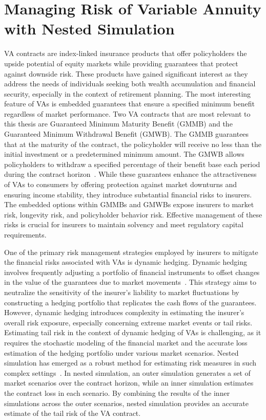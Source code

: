 \section{Managing Risk of Variable Annuity with Nested Simulation}

VA contracts are index-linked insurance products that offer policyholders the upside potential of equity markets while providing guarantees that protect against downside risk.
These products have gained significant interest as they address the needs of individuals seeking both wealth accumulation and financial security, especially in the context of retirement planning.
The most interesting feature of VAs is embedded guarantees that ensure a specified minimum benefit regardless of market performance.
Two VA contracts that are most relevant to this thesis are Guaranteed Minimum Maturity Benefit (GMMB) and the Guaranteed Minimum Withdrawal Benefit (GMWB). 
The GMMB guarantees that at the maturity of the contract, the policyholder will receive no less than the initial investment or a predetermined minimum amount. 
The GMWB allows policyholders to withdraw a specified percentage of their benefit base each period during the contract horizon~\citep{hardy2003investment}.
While these guarantees enhance the attractiveness of VAs to consumers by offering protection against market downturns and ensuring income stability, they introduce substantial financial risks to insurers. 
The embedded options within GMMBs and GMWBs expose insurers to market risk, longevity risk, and policyholder behavior risk. 
Effective management of these risks is crucial for insurers to maintain solvency and meet regulatory capital requirements.

One of the primary risk management strategies employed by insurers to mitigate the financial risks associated with VAs is dynamic hedging. 
Dynamic hedging involves frequently adjusting a portfolio of financial instruments to offset changes in the value of the guarantees due to market movements~\citep{hull2016options}. 
This strategy aims to neutralize the sensitivity of the insurer's liability to market fluctuations by constructing a hedging portfolio that replicates the cash flows of the guarantees.
However, dynamic hedging introduces complexity in estimating the insurer's overall risk exposure, especially concerning extreme market events or tail risks.
Estimating tail risk in the context of dynamic hedging of VAs is challenging, as it requires the stochastic modeling of the financial market and the accurate loss estimation of the hedging portfolio under various market scenarios.
Nested simulation has emerged as a robust method for estimating risk measures in such complex settings~\citep{gordy2010nested}.
In nested simulation, an outer simulation generates a set of market scenarios over the contract horizon, while an inner simulation estimates the contract loss in each scenario.
By combining the results of the inner simulations across the outer scenarios, nested simulation provides an accurate estimate of the tail risk of the VA contract.

